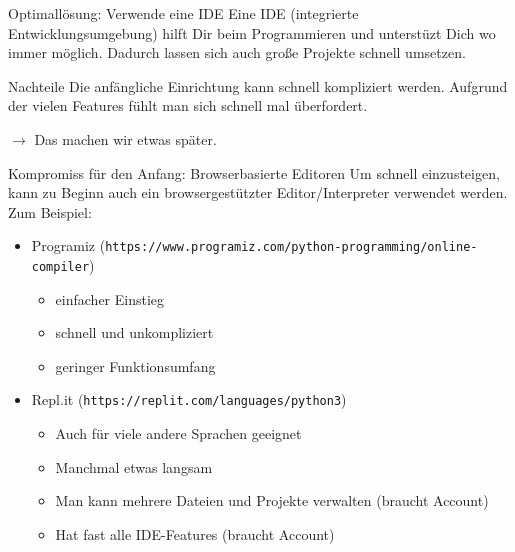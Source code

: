 \begin{frame}
\begin{block}{Optimallösung: Verwende eine IDE}
	\vspace{2pt}	
	Eine IDE (integrierte Entwicklungsumgebung) hilft Dir beim Programmieren und unterstüzt Dich wo immer möglich. Dadurch lassen sich auch große Projekte schnell umsetzen. 
\end{block}
\pause 

\vspace{12pt}

\begin{alertblock}{Nachteile}
	\vspace{2pt}
	Die anfängliche Einrichtung kann schnell kompliziert werden. Aufgrund der vielen Features fühlt man sich schnell mal überfordert. 
	\pause 
	
	$\rightarrow$ Das machen wir etwas später.	
\end{alertblock}
\end{frame}


\begin{frame}
\begin{block}{Kompromiss für den Anfang: Browserbasierte Editoren}
\vspace{2pt}
Um schnell einzusteigen, kann zu Beginn auch ein browsergestützter Editor/Interpreter verwendet werden. Zum Beispiel: 
\pause
\begin{itemize}
	\item Programiz (\texttt{https://www.programiz.com/python-programming/online-compiler})
	\begin{itemize}
		\item einfacher Einstieg
		\item schnell und unkompliziert
		\item geringer Funktionsumfang
	\end{itemize}
	\pause
	\item Repl.it (\texttt{https://replit.com/languages/python3})
	\begin{itemize}
		\item Auch für viele andere Sprachen geeignet
		\item Manchmal etwas langsam
		\item Man kann mehrere Dateien und Projekte verwalten (braucht Account) 
		\item Hat fast alle IDE-Features (braucht Account)
	\end{itemize}
\end{itemize}
\end{block}

\end{frame}



